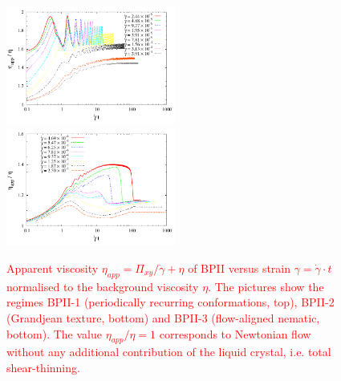\documentclass[8.5pt,twoside,twocolumn]{article}
\newcommand{\gd}{\dot{\gamma}}
\newcommand{\rev}[1]{{\textcolor{red}{#1}}}
\begin{document}
\begin{figure}[htpb]
\includegraphics[width=0.495\textwidth]{app_visc_strain_bp2_a.pdf}\\
\includegraphics[width=0.495\textwidth]{app_visc_strain_bp2_b.pdf}\\
\caption{
\rev{
Apparent viscosity $\eta_{app}=\Pi_{xy}/\gd + \eta$ 
of BPII versus strain $\gamma = \gd\cdot t$  
normalised to the background viscosity $\eta$.
The pictures show the regimes BPII-1 (periodically recurring conformations, top), BPII-2 (Grandjean texture, bottom) and BPII-3 (flow-aligned nematic, bottom). 
The value $\eta_{app}/\eta=1$ corresponds to Newtonian flow without any additional contribution of the liquid crystal, i.e. total shear-thinning.
}
} 
\label{bp2-appvisc}
\end{figure}
\end{document}
